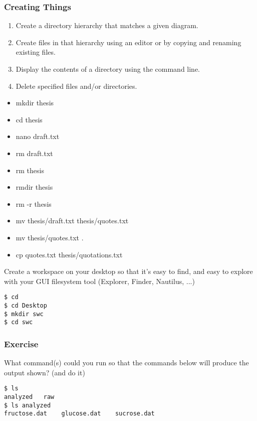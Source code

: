 \documentclass[xcolor=dvipsnames]{beamer}
\begin{document}
\begin{frame}[label=CreatingThings]
\frametitle{Creating Things}
\begin{enumerate}
\item    Create a directory hierarchy that matches a given diagram.
\item    Create files in that hierarchy using an editor or by copying and renaming existing files.
\item    Display the contents of a directory using the command line.
\item    Delete specified files and/or directories.
\end{enumerate}
\begin{multicols}{2}
\begin{itemize}
\item mkdir thesis
\item cd thesis
\item nano draft.txt
\item rm draft.txt
\item rm thesis
\item rmdir thesis
\item rm -r thesis
\item mv thesis/draft.txt thesis/quotes.txt
\item mv thesis/quotes.txt .
\item cp quotes.txt thesis/quotations.txt
\end{itemize}
\end{multicols}
\end{frame}


\begin{frame}[fragile]
Create a workspace on your desktop so that it's easy to find,
and easy to explore with your GUI filesystem tool
(Explorer, Finder, Nautilus, ...)
\begin{verbatim}
$ cd
$ cd Desktop
$ mkdir swc
$ cd swc
\end{verbatim}
\end{frame}




\begin{frame}[fragile]
\frametitle{Exercise}
What command(s) could you run so that the commands below will produce the output shown? (and do it)
\begin{verbatim}
$ ls
analyzed   raw
$ ls analyzed
fructose.dat    glucose.dat    sucrose.dat
\end{verbatim}
\end{frame}
\end{document}
